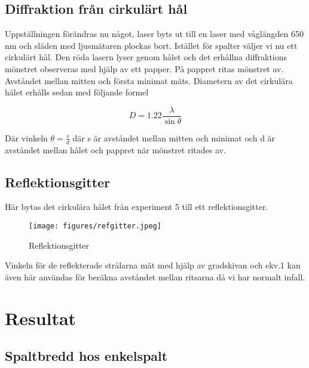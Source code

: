 \documentclass[a4paper]{article}
\begin{document}
\subsection{Diffraktion från cirkulärt hål}

Uppställningen förändras nu något, laser byts ut till en laser med våglängden 650 nm och släden med ljusmätaren plockas bort. Istället för spalter väljer vi nu ett cirkulärt hål. Den röda lasern lyser genom hålet och det erhållna diffraktions mönstret observeras med hjälp av ett papper. På pappret ritas mönstret av. Avståndet mellan mitten och första minimat mäts. Diametern av det cirkulära hålet erhålls sedan med följande formel

\begin{equation}
    D = 1.22 \frac{\lambda}{\sin\theta}
\end{equation}

Där vinkeln $\theta = \frac{s}{d}$ där s är avståndet mellan mitten och minimat och d är avståndet mellan hålet och pappret när mönstret ritades av. 

\subsection{Reflektionsgitter}

Här bytas det cirkulära hålet från experiment 5 till ett reflektionsgitter.

\begin{figure}[H]
    \begin{small}
        \begin{center}
            \texttt{[image: figures/refgitter.jpeg]}
        \end{center}
        \caption{Reflektionsgitter}
        \label{fig:refgit}
    \end{small}
\end{figure}

Vinkeln för de reflekterade strålarna mät med hjälp av gradskivan och ekv.1 kan även här användas för beräkna avståndet mellan ritsarna då vi har normalt infall. 

\section{Resultat}

\subsection{Spaltbredd hos enkelspalt}
\end{document}
